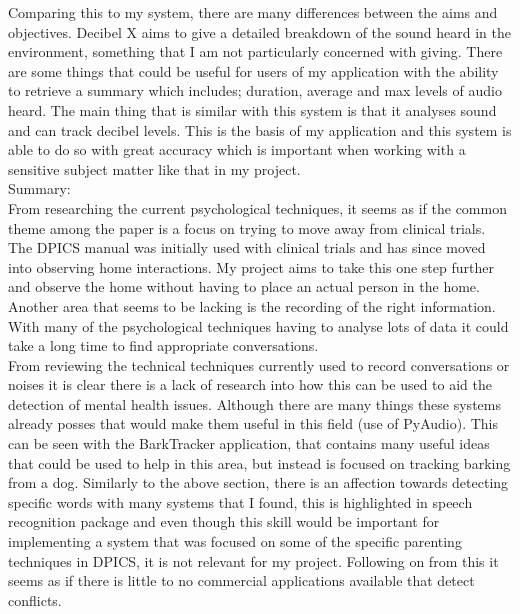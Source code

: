 \documentclass[a4paper,11pt]{report}
\begin{document}
Comparing this to my system, there are many differences between the aims and objectives. Decibel X aims to give a detailed breakdown of the sound heard in the environment, something that I am not particularly concerned with giving. There are some things that could be useful for users of my application with the ability to retrieve a summary which includes; duration, average and max levels of audio heard. The main thing that is similar with this system is that it analyses sound and can track decibel levels. This is the basis of my application and this system is able to do so with great accuracy which is important when working with a sensitive subject matter like that in my project.\\

Summary:\\
From researching the current psychological techniques, it seems as if the common theme among the paper is a focus on trying to move away from clinical trials. The DPICS manual was initially used with clinical trials and has since moved into observing home interactions. My project aims to take this one step further and observe the home without having to place an actual person in the home. Another area that seems to be lacking is the recording of the right information. With many of the psychological techniques having to analyse lots of data it could take a long time to find appropriate conversations.\\

From reviewing the technical techniques currently used to record conversations or noises it is clear there is a lack of research into how this can be used to aid the detection of mental health issues. Although there are many things these systems already posses that would make them useful in this field (use of PyAudio). This can be seen with the BarkTracker application, that contains many useful ideas that could be used to help in this area, but instead is focused on tracking barking from a dog. Similarly to the above section, there is an affection towards detecting specific words with many systems that I found, this is highlighted in speech recognition package and even though this skill would be important for implementing a system that was focused on some of the specific parenting techniques in DPICS, it is not relevant for my project. Following on from this it seems as if there is little to no commercial applications available that detect conflicts.\\ 
\end{document}
